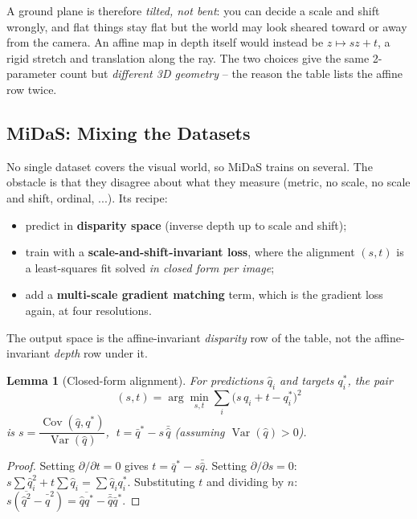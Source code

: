 \documentclass[11pt,a4paper]{article}
\theoremstyle{definition}
\theoremstyle{plain}
\newtheorem{lemma}[definition]{Lemma}
\theoremstyle{remark}
\begin{document}
\begin{intuition}
A ground plane is therefore \emph{tilted, not bent}: you can decide a scale and shift wrongly, and flat things stay flat but the world may look sheared toward or away from the camera. An affine map in depth itself would instead be $z\mapsto sz+t$, a rigid stretch and translation along the ray. The two choices give the same 2-parameter count but \emph{different 3D geometry} -- the reason the table lists the affine row twice.
\end{intuition}
 
\subsection{MiDaS: Mixing the Datasets }
 
No single dataset covers the visual world, so MiDaS trains on several. The obstacle is that they disagree about what they measure (metric, no scale, no scale and shift, ordinal, ...). Its recipe:
\begin{itemize}
\item predict in \textbf{disparity space} (inverse depth up to scale and shift);
\item train with a \textbf{scale-and-shift-invariant loss}, where the alignment $(s,t)$ is a least-squares fit solved \emph{in closed form per image};
\item add a \textbf{multi-scale gradient matching} term, which is the gradient loss again, at four resolutions.
\end{itemize}
The output space is the affine-invariant \emph{disparity} row of the table, not the affine-invariant \emph{depth} row under it.
 
\begin{lemma}[Closed-form alignment]\label{lem:ssi}
For predictions $\hat q_i$ and targets $q^\ast_i$, the pair
\[
(s,t)=\arg\min_{s,t}\sum_i\big(s\,\hat q_i+t-q^\ast_i\big)^2
\]
is $s=\dfrac{\operatorname{Cov}(\hat q,q^\ast)}{\operatorname{Var}(\hat q)}$, $\;t=\bar q^\ast-s\,\bar{\hat q}$ (assuming $\operatorname{Var}(\hat q)>0$).
\end{lemma}
\begin{proof}
Setting $\partial/\partial t=0$ gives $t=\bar q^\ast-s\bar{\hat q}$. Setting $\partial/\partial s=0$: $s\sum\hat q_i^2+t\sum\hat q_i=\sum\hat q_iq_i^\ast$. Substituting $t$ and dividing by $n$: $s(\overline{\hat q^2}-\bar{\hat q}^2)=\overline{\hat qq^\ast}-\bar{\hat q}\bar q^\ast$. \qedhere
\end{proof}
 
\end{document}
